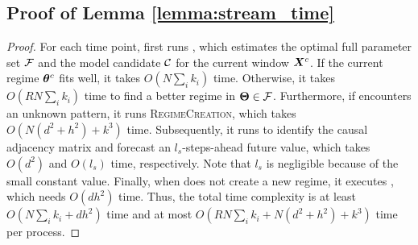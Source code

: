 \subsection{Proof of Lemma \ref{lemma:stream_time}}
\begin{proof}
For each time point, \method first runs \modelestimator,
which estimates the optimal full parameter set $\mathcal{F}$ and the model candidate $\mathcal{C}$ for the current window $\bm{X}^c$.
If the current regime $\boldsymbol{\theta}^c$ fits well,
it takes $O(N\sum_i k_i)$ time.
Otherwise, it takes $O(RN\sum_i k_i)$ time to find a better regime in $\boldsymbol{\Theta}\in\mathcal{F}$.
Furthermore, if \method encounters an unknown pattern,
it runs \textsc{RegimeCreation}, which takes $O(N(d^2+h^2)+k^3)$ time.
Subsequently, it runs \modelgenerator to identify the causal adjacency matrix and forecast an $l_s$-steps-ahead future value,
which takes $O(d^2)$ and $O(l_s)$ time, respectively.
Note that $l_s$ is negligible because of the small constant value.
Finally, when \method does not create a new regime,
it executes \regimeupdate, which needs $O(dh^2)$ time.
Thus, the total time complexity is at least $O(N\sum_ik_i+dh^2)$ time and at most $O(RN\sum_i k_i+N(d^2+h^2)+k^3)$ time per process.
\end{proof}

% 
% 
